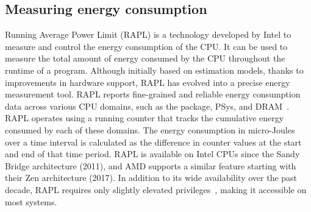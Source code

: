 \subsection{Measuring energy consumption}
Running Average Power Limit (RAPL) is a technology developed by Intel to measure and control the
energy consumption of the CPU. It can be used to measure the total amount of energy consumed by the
CPU throughout the runtime of a program. Although initially based on estimation models, thanks to
improvements in hardware support, RAPL has evolved into a precise energy measurement tool. RAPL
reports fine-grained and reliable energy consumption data across various CPU domains, such as the
package, PSys, and DRAM~\cite{rapl}. RAPL operates using a running counter that tracks the
cumulative energy consumed by each of these domains. The energy consumption in micro-Joules over a
time interval is calculated as the difference in counter values at the start and end of that time
period. RAPL is available on Intel CPUs since the Sandy Bridge architecture (2011), and AMD supports
a similar feature starting with their Zen architecture (2017). In addition to its wide availability
over the past decade, RAPL requires only slightly elevated privileges~\cite{rapl-security}, making
it accessible on most systems.
